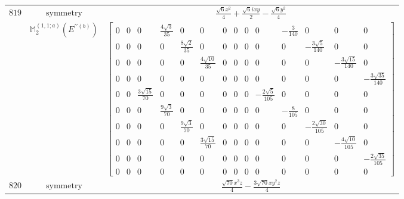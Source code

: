 \documentclass[fleqn,8pt,landscape]{jsarticle}
\begin{document}
\begin{longtable}{ccc}
$ 819 $ & $ \text{symmetry} $ & $ \frac{\sqrt{6} x^{2}}{4} + \frac{\sqrt{6} i x y}{2} - \frac{\sqrt{6} y^{2}}{4} $ \\
$  $ & $ \mathbb{M}_{2}^{(1,1;a)}(E^{\prime\prime(b)}) $ & $ \begin{bmatrix} 0 & 0 & 0 & \frac{4 \sqrt{3}}{35} & 0 & 0 & 0 & 0 & 0 & 0 & - \frac{3}{140} & 0 & 0 & 0 \\ 0 & 0 & 0 & 0 & \frac{8 \sqrt{2}}{35} & 0 & 0 & 0 & 0 & 0 & 0 & - \frac{3 \sqrt{5}}{140} & 0 & 0 \\ 0 & 0 & 0 & 0 & 0 & \frac{4 \sqrt{10}}{35} & 0 & 0 & 0 & 0 & 0 & 0 & - \frac{3 \sqrt{15}}{140} & 0 \\ 0 & 0 & 0 & 0 & 0 & 0 & 0 & 0 & 0 & 0 & 0 & 0 & 0 & - \frac{3 \sqrt{35}}{140} \\ 0 & 0 & \frac{3 \sqrt{15}}{70} & 0 & 0 & 0 & 0 & 0 & 0 & - \frac{2 \sqrt{5}}{105} & 0 & 0 & 0 & 0 \\ 0 & 0 & 0 & \frac{9 \sqrt{3}}{70} & 0 & 0 & 0 & 0 & 0 & 0 & - \frac{8}{105} & 0 & 0 & 0 \\ 0 & 0 & 0 & 0 & \frac{9 \sqrt{3}}{70} & 0 & 0 & 0 & 0 & 0 & 0 & - \frac{2 \sqrt{30}}{105} & 0 & 0 \\ 0 & 0 & 0 & 0 & 0 & \frac{3 \sqrt{15}}{70} & 0 & 0 & 0 & 0 & 0 & 0 & - \frac{4 \sqrt{10}}{105} & 0 \\ 0 & 0 & 0 & 0 & 0 & 0 & 0 & 0 & 0 & 0 & 0 & 0 & 0 & - \frac{2 \sqrt{35}}{105} \\ 0 & 0 & 0 & 0 & 0 & 0 & 0 & 0 & 0 & 0 & 0 & 0 & 0 & 0 \end{bmatrix} $ \\ \hline
$ 820 $ & $ \text{symmetry} $ & $ \frac{\sqrt{70} x^{3} z}{4} - \frac{3 \sqrt{70} x y^{2} z}{4} $ \\

\end{longtable}
\end{document}

